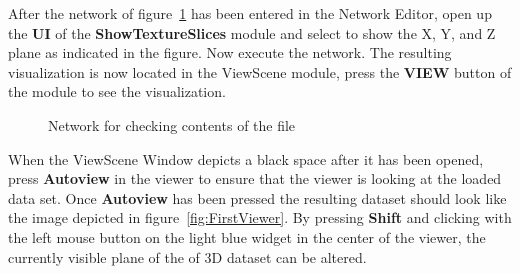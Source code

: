 \documentclass[fleqn,11pt,openany]{book}
\begin{document}
After the network of figure~\ref{fig:FullNetwork} has been entered in the Network Editor, open up the {\bf UI} of the  {\bf ShowTextureSlices} module and select to show the X, Y, and Z plane as indicated in the figure. Now execute the network. The resulting visualization is now located in the ViewScene module, press the {\bf VIEW} button of the module to see the visualization.

\begin{figure}
\caption{Network for checking contents of the file}\label{fig:FullNetwork}
\end{figure}

When the ViewScene Window depicts a black space after it has been opened, press {\bf Autoview} in the viewer to ensure that the viewer is looking at the loaded data set. Once {\bf Autoview} has been pressed the resulting dataset should look like the image depicted in figure~\ref{fig:FirstViewer}. By pressing {\bf Shift} and clicking with the left mouse button on the light blue widget in the center of the viewer, the currently visible plane of the of 3D dataset can be altered. 
\end{document}
